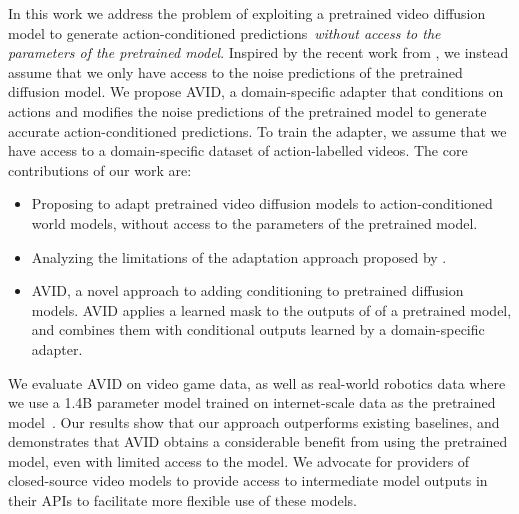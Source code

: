 In this work we address the problem of exploiting a pretrained video diffusion model to generate action-conditioned predictions~\textit{without access to the parameters of the pretrained model}.
%
Inspired by the recent work from \citet{yang2024probabilistic}, we instead assume that we only have access to the noise predictions of the pretrained diffusion model.
%
We propose AVID, a domain-specific adapter that conditions on actions and modifies the noise predictions of the pretrained model to generate accurate action-conditioned predictions.
%
To train the adapter, we assume that we have access to a domain-specific dataset of action-labelled videos.
%
The core contributions of our work are:
\vspace{-1mm}
\begin{itemize}[leftmargin=*]
    \item Proposing to adapt pretrained video diffusion models to action-conditioned world models, without access to the parameters of the pretrained model.
    \item Analyzing the limitations of the adaptation approach proposed by \citet{yang2024probabilistic}.
    \item AVID, a novel approach to adding conditioning to pretrained diffusion models. AVID applies a learned mask to the outputs of of a pretrained model, and combines them with conditional outputs learned by a domain-specific adapter.
\end{itemize}
We evaluate AVID on video game data, as well as real-world robotics data where we use a 1.4B parameter model trained on internet-scale data as the pretrained model~\citep{xing2023dynamicrafter}.
%
Our results show that our  approach outperforms existing baselines, and demonstrates that AVID obtains a considerable benefit from using the pretrained model, even with limited access to the model.
%
We advocate for providers of closed-source video models to provide access to intermediate model outputs in their APIs to facilitate more flexible use of these models.